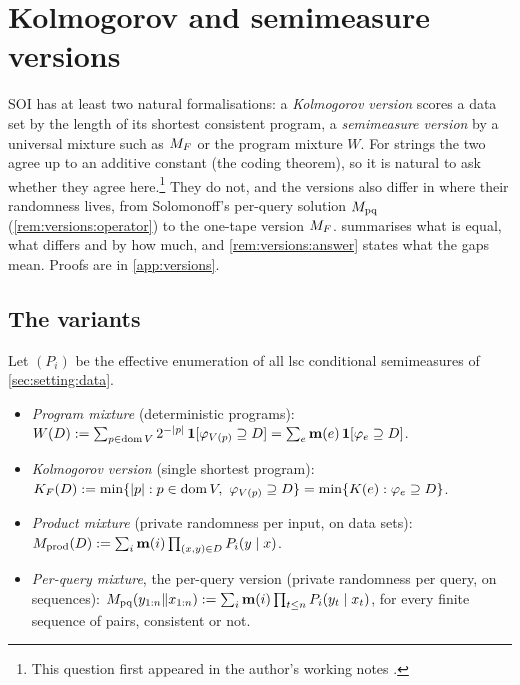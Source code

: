 \section{Kolmogorov and semimeasure versions}\label{sec:versions}

SOI has at least two natural formalisations: a \emph{Kolmogorov version} scores a data set by the length of its shortest consistent program, a \emph{semimeasure version} by a universal mixture such as $M_{F}$ or the program mixture $W$. For strings the two agree up to an additive constant (the coding theorem), so it is natural to ask whether they agree here.\footnote{This question first appeared in the author's working notes \citep{hanni2026notes}.} They do not, and the versions also differ in where their randomness lives, from Solomonoff's per-query solution $M_{\mathrm{pq}}$ (\cref{rem:versions:operator}) to the one-tape version $M_{F}$.  summarises what is equal, what differs and by how much, and \cref{rem:versions:answer} states what the gaps mean. Proofs are in \cref{app:versions}.

\subsection{The variants}\label{sec:versions:defs}

\begin{definition}[Variants]\label{def:versions:variants}
Let $(P_i)$ be the effective enumeration of all lsc conditional semimeasures of \cref{sec:setting:data}.
\begin{itemize}
\item \emph{Program mixture} (deterministic programs):\\ $W(D):=\sum_{p\in\operatorname{dom} V}2^{-|p|}\,\mathbf{1}[\varphi_{V(p)}\supseteq D]=\sum_e\mathbf{m}(e)\,\mathbf{1}[\varphi_e\supseteq D]$.
\item \emph{Kolmogorov version} (single shortest program): $\KF(D):=\min\{|p|:p\in\dom V,\ \varphi_{V(p)}\supseteq D\}=\min\{K(e):\varphi_e\supseteq D\}$.
\item \emph{Product mixture} (private randomness per input, on data sets):\\ $M_{\mathrm{prod}}(D):=\sum_i\mathbf{m}(i)\prod_{(x,y)\in D}P_i(y\mid x)$.
\item \emph{Per-query mixture}, the per-query version (private randomness per query, on sequences): $M_{\mathrm{pq}}(y_{1:n}\Vert x_{1:n}):=\sum_i\mathbf{m}(i)\prod_{t\le n}P_i(y_t\mid x_t)$, for every finite sequence of pairs, consistent or not.
\end{itemize}
\end{definition}

